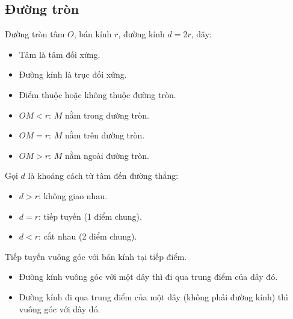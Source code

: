 \documentclass[12pt,a4paper]{article}
\begin{document}
\subsection{Đường tròn}

\begin{dinhnghia}
  Đường tròn tâm $O$, bán kính $r$, đường kính $d = 2r$, dây:
  \begin{itemize}
    \item Tâm là tâm đối xứng.
    \item Đường kính là trục đối xứng.
    \item Điểm thuộc hoặc không thuộc đường tròn.
  \end{itemize}
\end{dinhnghia}

\begin{tinhchat}[title={Vị trí tương đối của điểm $M$ với đường tròn $(O;\, r)$}]
  \begin{itemize}
    \item $OM < r$: $M$ nằm trong đường tròn.
    \item $OM = r$: $M$ nằm trên đường tròn.
    \item $OM > r$: $M$ nằm ngoài đường tròn.
  \end{itemize}
\end{tinhchat}

\begin{tinhchat}[title={Vị trí tương đối của đường thẳng với đường tròn}]
  Gọi $d$ là khoảng cách từ tâm đến đường thẳng:
  \begin{itemize}
    \item $d > r$: không giao nhau.
    \item $d = r$: tiếp tuyến (1 điểm chung).
    \item $d < r$: cắt nhau (2 điểm chung).
  \end{itemize}
  Tiếp tuyến vuông góc với bán kính tại tiếp điểm.
\end{tinhchat}

\begin{dinhly}[title={Liên hệ giữa đường kính và dây cung}]
  \begin{itemize}
    \item Đường kính vuông góc với một dây thì đi qua trung điểm của dây đó.
    \item Đường kính đi qua trung điểm của một dây (không phải đường kính) thì vuông góc với dây đó.
  \end{itemize}
\end{dinhly}
\end{document}
